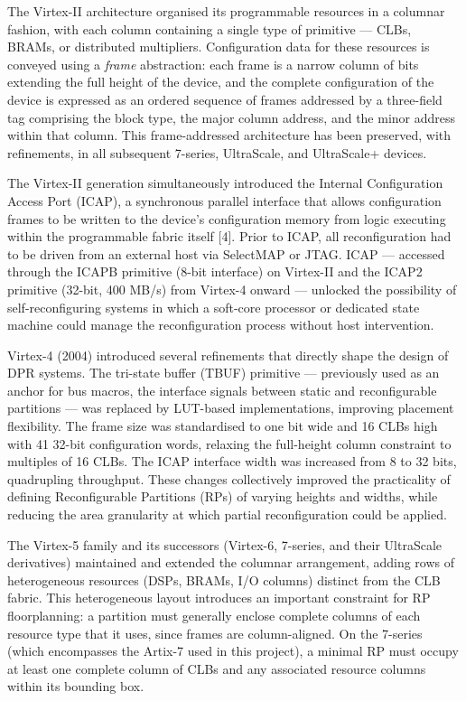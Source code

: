The Virtex-II architecture organised its programmable resources in a columnar fashion, with each column containing a single type of primitive — CLBs, BRAMs, or distributed multipliers. Configuration data for these resources is conveyed using a \textit{frame} abstraction: each frame is a narrow column of bits extending the full height of the device, and the complete configuration of the device is expressed as an ordered sequence of frames addressed by a three-field tag comprising the block type, the major column address, and the minor address within that column. This frame-addressed architecture has been preserved, with refinements, in all subsequent 7-series, UltraScale, and UltraScale+ devices.

The Virtex-II generation simultaneously introduced the Internal Configuration Access Port (ICAP), a synchronous parallel interface that allows configuration frames to be written to the device's configuration memory from logic executing within the programmable fabric itself [4]. Prior to ICAP, all reconfiguration had to be driven from an external host via SelectMAP or JTAG. ICAP — accessed through the ICAPB primitive (8-bit interface) on Virtex-II and the ICAP2 primitive (32-bit, 400 MB/s) from Virtex-4 onward — unlocked the possibility of self-reconfiguring systems in which a soft-core processor or dedicated state machine could manage the reconfiguration process without host intervention.

Virtex-4 (2004) introduced several refinements that directly shape the design of DPR systems. The tri-state buffer (TBUF) primitive — previously used as an anchor for bus macros, the interface signals between static and reconfigurable partitions — was replaced by LUT-based implementations, improving placement flexibility. The frame size was standardised to one bit wide and 16 CLBs high with 41 32-bit configuration words, relaxing the full-height column constraint to multiples of 16 CLBs. The ICAP interface width was increased from 8 to 32 bits, quadrupling throughput. These changes collectively improved the practicality of defining Reconfigurable Partitions (RPs) of varying heights and widths, while reducing the area granularity at which partial reconfiguration could be applied.

The Virtex-5 family and its successors (Virtex-6, 7-series, and their UltraScale derivatives) maintained and extended the columnar arrangement, adding rows of heterogeneous resources (DSPs, BRAMs, I/O columns) distinct from the CLB fabric. This heterogeneous layout introduces an important constraint for RP floorplanning: a partition must generally enclose complete columns of each resource type that it uses, since frames are column-aligned. On the 7-series (which encompasses the Artix-7 used in this project), a minimal RP must occupy at least one complete column of CLBs and any associated resource columns within its bounding box.

